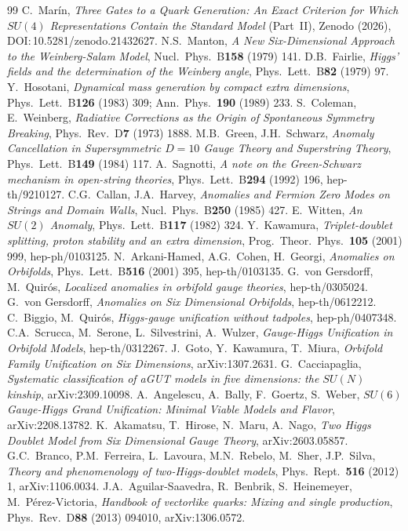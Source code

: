 \documentclass[11pt,a4paper]{article}
\begin{document}
\begin{thebibliography}{99}
 C.~Mar\'in, \emph{Three Gates to a Quark Generation: An Exact Criterion for
Which $SU(4)$ Representations Contain the Standard Model} (Part~II), Zenodo (2026),
DOI:\,10.5281/zenodo.21432627.
 N.S.~Manton, \emph{A New Six-Dimensional Approach to the
Weinberg-Salam Model}, Nucl.\ Phys.\ B\textbf{158} (1979) 141.
 D.B.~Fairlie, \emph{Higgs' fields and the determination of the
Weinberg angle}, Phys.\ Lett.\ B\textbf{82} (1979) 97.
 Y.~Hosotani, \emph{Dynamical mass generation by compact extra
dimensions}, Phys.\ Lett.\ B\textbf{126} (1983) 309; Ann.\ Phys.\ \textbf{190} (1989) 233.
 S.~Coleman, E.~Weinberg, \emph{Radiative Corrections as the
Origin of Spontaneous Symmetry Breaking}, Phys.\ Rev.\ D\textbf{7} (1973) 1888.
 M.B.~Green, J.H.~Schwarz, \emph{Anomaly Cancellation in
Supersymmetric $D=10$ Gauge Theory and Superstring Theory}, Phys.\ Lett.\ B\textbf{149}
(1984) 117.
 A.~Sagnotti, \emph{A note on the Green-Schwarz mechanism in
open-string theories}, Phys.\ Lett.\ B\textbf{294} (1992) 196, hep-th/9210127.
 C.G.~Callan, J.A.~Harvey, \emph{Anomalies and Fermion Zero Modes
on Strings and Domain Walls}, Nucl.\ Phys.\ B\textbf{250} (1985) 427.
 E.~Witten, \emph{An $SU(2)$ Anomaly}, Phys.\ Lett.\ B\textbf{117}
(1982) 324.
 Y.~Kawamura, \emph{Triplet-doublet splitting, proton stability
and an extra dimension}, Prog.\ Theor.\ Phys.\ \textbf{105} (2001) 999, hep-ph/0103125.
 N.~Arkani-Hamed, A.G.~Cohen, H.~Georgi, \emph{Anomalies on Orbifolds},
Phys.\ Lett.\ B\textbf{516} (2001) 395, hep-th/0103135.
 G.~von Gersdorff, M.~Quir\'os, \emph{Localized anomalies in orbifold
gauge theories}, hep-th/0305024.
 G.~von Gersdorff, \emph{Anomalies on Six Dimensional Orbifolds},
hep-th/0612212.
 C.~Biggio, M.~Quir\'os, \emph{Higgs-gauge unification without
tadpoles}, hep-ph/0407348.
 C.A.~Scrucca, M.~Serone, L.~Silvestrini, A.~Wulzer,
\emph{Gauge-Higgs Unification in Orbifold Models}, hep-th/0312267.
 J.~Goto, Y.~Kawamura, T.~Miura, \emph{Orbifold Family Unification
on Six Dimensions}, arXiv:1307.2631.
 G.~Cacciapaglia, \emph{Systematic classification of aGUT models in five
dimensions: the $SU(N)$ kinship}, arXiv:2309.10098.
 A.~Angelescu, A.~Bally, F.~Goertz, S.~Weber, \emph{$SU(6)$
Gauge-Higgs Grand Unification: Minimal Viable Models and Flavor}, arXiv:2208.13782.
 K.~Akamatsu, T.~Hirose, N.~Maru, A.~Nago, \emph{Two Higgs Doublet Model
from Six Dimensional Gauge Theory}, arXiv:2603.05857.
 G.C.~Branco, P.M.~Ferreira, L.~Lavoura, M.N.~Rebelo, M.~Sher, J.P.~Silva,
\emph{Theory and phenomenology of two-Higgs-doublet models}, Phys.\ Rept.\ \textbf{516}
(2012) 1, arXiv:1106.0034.
 J.A.~Aguilar-Saavedra, R.~Benbrik, S.~Heinemeyer, M.~P\'erez-Victoria,
\emph{Handbook of vectorlike quarks: Mixing and single production}, Phys.\ Rev.\
D\textbf{88} (2013) 094010, arXiv:1306.0572.
\end{thebibliography}
\end{document}
